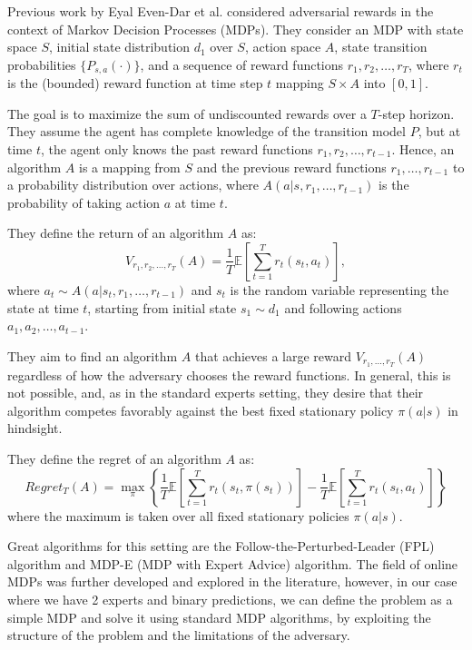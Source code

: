 \documentclass[a4paper, 12pt]{article}
\begin{document}
Previous work by Eyal Even-Dar et al. considered adversarial rewards in the context of Markov Decision Processes (MDPs).
They consider an MDP with state space $S$, initial state distribution $d_1$ over $S$, action space $A$, 
state transition probabilities $\{P_{s,a}(\cdot)\}$, and a sequence of reward functions $r_1, r_2, \ldots, r_T$, 
where $r_t$ is the (bounded) reward function at time step $t$ mapping $S \times A$ into $[0, 1]$.

The goal is to maximize the sum of undiscounted rewards over a $T$-step horizon. 
They assume the agent has complete knowledge of the transition model $P$, but at time $t$, 
the agent only knows the past reward functions $r_1, r_2, \ldots, r_{t-1}$. 
Hence, an algorithm $A$ is a mapping from $S$ and the previous reward functions $r_1, \ldots, r_{t-1}$ to a probability distribution over actions, 
where $A(a|s, r_1, \ldots, r_{t-1})$ is the probability of taking action $a$ at time $t$.

They define the return of an algorithm $A$ as:
\[
V_{r_1, r_2, \ldots, r_T}(A) = \frac{1}{T} \mathbb{E} \left[ \sum_{t=1}^{T} r_t(s_t, a_t) \right],
\]
where $a_t \sim A(a|s_t, r_1, \ldots, r_{t-1})$ and $s_t$ is the random variable representing the state at time $t$, 
starting from initial state $s_1 \sim d_1$ and following actions $a_1, a_2, \ldots, a_{t-1}$.

They aim to find an algorithm $A$ that achieves a large reward $V_{r_1, \ldots, r_T}(A)$ regardless of how the adversary chooses the reward functions. 
In general, this is not possible, and, as in the standard experts setting, they desire that their algorithm competes favorably against the best fixed stationary policy $\pi(a|s)$ in hindsight.

They define the regret of an algorithm $A$ as:
\[
Regret_T(A) = \max_{\pi} \left\{ \frac{1}{T} \mathbb{E} \left[ \sum_{t=1}^{T} r_t(s_t, \pi(s_t)) \right] - \frac{1}{T} \mathbb{E} \left[ \sum_{t=1}^{T} r_t(s_t, a_t) \right] \right\}
\]
where the maximum is taken over all fixed stationary policies $\pi(a|s)$.

\medskip
Great algorithms for this setting are the Follow-the-Perturbed-Leader (FPL) algorithm and MDP-E (MDP with Expert Advice) algorithm.
The field of online MDPs was further developed and explored in the literature, however, in our case where we have 2 experts and binary predictions,
we can define the problem as a simple MDP and solve it using standard MDP algorithms, by exploiting the structure of the problem and the limitations of the adversary.
\end{document}

